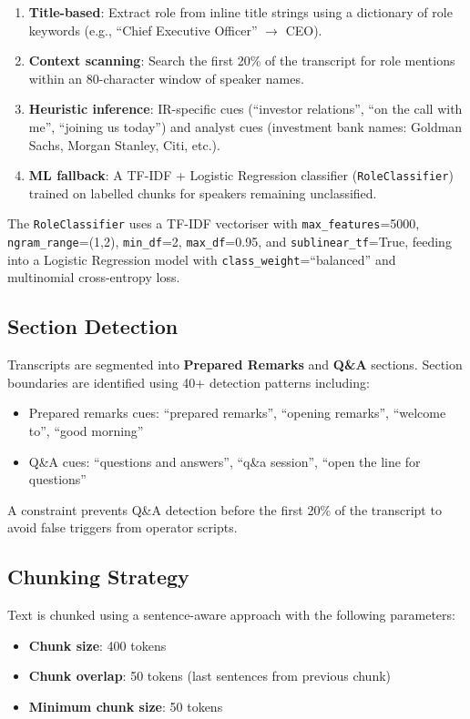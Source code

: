 \documentclass[12pt,a4paper]{article}
\begin{document}
\begin{enumerate}[noitemsep]
    \item \textbf{Title-based}: Extract role from inline title strings using a dictionary of role keywords (e.g., ``Chief Executive Officer'' $\to$ CEO).
    \item \textbf{Context scanning}: Search the first 20\% of the transcript for role mentions within an 80-character window of speaker names.
    \item \textbf{Heuristic inference}: IR-specific cues (``investor relations'', ``on the call with me'', ``joining us today'') and analyst cues (investment bank names: Goldman Sachs, Morgan Stanley, Citi, etc.).
    \item \textbf{ML fallback}: A TF-IDF + Logistic Regression classifier (\texttt{RoleClassifier}) trained on labelled chunks for speakers remaining unclassified.
\end{enumerate}

The \texttt{RoleClassifier} uses a TF-IDF vectoriser with \texttt{max\_features}=5000, \texttt{ngram\_range}=(1,2), \texttt{min\_df}=2, \texttt{max\_df}=0.95, and \texttt{sublinear\_tf}=True, feeding into a Logistic Regression model with \texttt{class\_weight}=``balanced'' and multinomial cross-entropy loss.

\subsection{Section Detection}

Transcripts are segmented into \textbf{Prepared Remarks} and \textbf{Q\&A} sections. Section boundaries are identified using 40+ detection patterns including:
\begin{itemize}[noitemsep]
    \item Prepared remarks cues: ``prepared remarks'', ``opening remarks'', ``welcome to'', ``good morning''
    \item Q\&A cues: ``questions and answers'', ``q\&a session'', ``open the line for questions''
\end{itemize}

A constraint prevents Q\&A detection before the first 20\% of the transcript to avoid false triggers from operator scripts.

\subsection{Chunking Strategy}

Text is chunked using a sentence-aware approach with the following parameters:
\begin{itemize}[noitemsep]
    \item \textbf{Chunk size}: 400 tokens
    \item \textbf{Chunk overlap}: 50 tokens (last sentences from previous chunk)
    \item \textbf{Minimum chunk size}: 50 tokens
\end{itemize}
\end{document}
